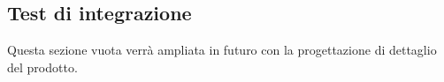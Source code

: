 \documentclass[10pt, a4paper]{article}
\begin{document}
\subsection{Test di integrazione}
Questa sezione vuota verrà ampliata in futuro con la progettazione di dettaglio del prodotto.

\end{document}
